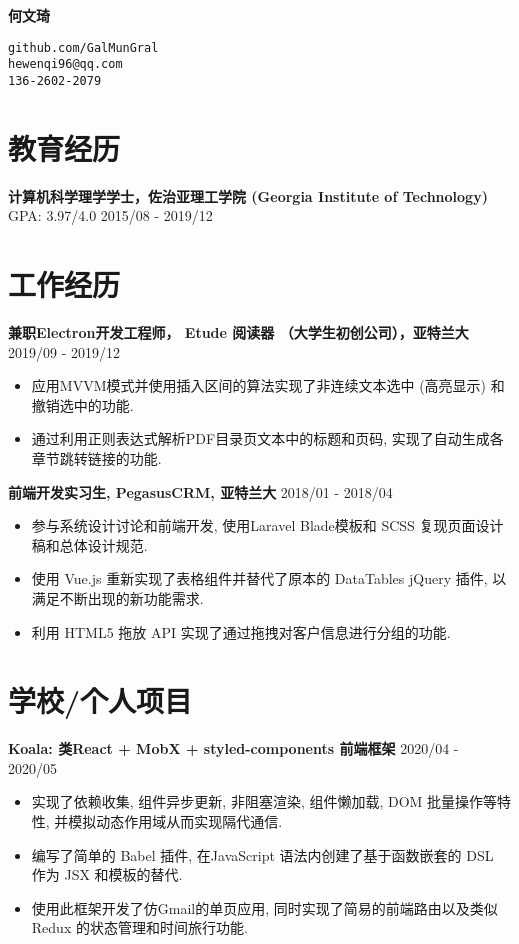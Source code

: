 \documentclass[10.5pt]{article}
\begin{document}
\parbox{0.25\textwidth}{\hfill}
\parbox{0.5\textwidth}{\centering\huge\bfseries 何文琦}
\parbox{0.25\textwidth}{\texttt{github.com/GalMunGral\\hewenqi96@qq.com\\ 136-2602-2079 }}

\section*{教育经历}
\textbf{计算机科学理学学士，佐治亚理工学院 (Georgia Institute of Technology)} GPA: 3.97/4.0 \hfill 2015/08 - 2019/12

\section*{工作经历}
\textbf{兼职Electron开发工程师， Etude 阅读器 （大学生初创公司），亚特兰大} \hfill 2019/09 - 2019/12
\begin{itemize}
\item 应用MVVM模式并使用插入区间的算法实现了非连续文本选中 (高亮显示) 和撤销选中的功能.
\item 通过利用正则表达式解析PDF目录页文本中的标题和页码, 实现了自动生成各章节跳转链接的功能.
\end{itemize}

\textbf{前端开发实习生, PegasusCRM, 亚特兰大} \hfill 2018/01 - 2018/04
\begin{itemize}
\item  参与系统设计讨论和前端开发, 使用Laravel Blade模板和 SCSS 复现页面设计稿和总体设计规范.
\item 使用 Vue.js 重新实现了表格组件并替代了原本的 DataTables jQuery 插件, 以满足不断出现的新功能需求.
\item 利用 HTML5 拖放 API 实现了通过拖拽对客户信息进行分组的功能.
\end{itemize}


\section*{学校/个人项目}
\textbf{Koala: 类React + MobX + styled-components 前端框架} \hfill 2020/04 - 2020/05
\begin{itemize}
\item 实现了依赖收集, 组件异步更新, 非阻塞渲染, 组件懒加载, DOM 批量操作等特性, 并模拟动态作用域从而实现隔代通信.
\item 编写了简单的 Babel 插件, 在JavaScript 语法内创建了基于函数嵌套的 DSL 作为 JSX 和模板的替代.
\item 使用此框架开发了仿Gmail的单页应用, 同时实现了简易的前端路由以及类似 Redux 的状态管理和时间旅行功能.
\end{itemize}
\end{document}
